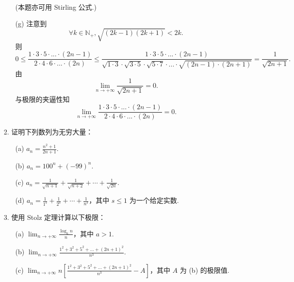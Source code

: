 \begin{enumerate}
\begin{solution}
\begin{enumerate}
\[            \]
            (本题亦可用 Stirling 公式.)
            \item[(g)]注意到
            \[
            \forall k\in\mathbb{N}_{+}, \sqrt{(2k-1)(2k+1)}<2k.
            \]
            则
            \[
            0\leq\frac{1\cdot3\cdot5\cdot...\cdot(2n-1)}{2\cdot4\cdot6\cdot...\cdot(2n)}
            \leq\frac{1\cdot3\cdot5\cdot...\cdot(2n-1)}{\sqrt{1\cdot3}\cdot\sqrt{3\cdot5}\cdot\sqrt{5\cdot7}\cdot...\cdot\sqrt{(2n-1)\cdot(2n+1)}}
            =\frac{1}{\sqrt{2n+1}}.
            \]
            由
            \[
            \lim_{n \to +\infty}\frac{1}{\sqrt{2n+1}}=0.
            \]
            与极限的夹逼性知
            \[
            \lim_{n \to +\infty}\frac{1\cdot3\cdot5\cdot...\cdot(2n-1)}{2\cdot4\cdot6\cdot...\cdot(2n)}=0.
            \]
        \end{enumerate}
        \end{solution}

    \item[2.]证明下列数列为无穷大量：
    \begin{enumerate}
        \item[(a)]$\displaystyle a_n=\frac{n^2+1}{2n+1}$.
        \item[(b)]$\displaystyle a_n=100^n+(-99)^n$.
        \item[(c)]$\displaystyle a_n=\frac{1}{\sqrt{n+1}}+\frac{1}{\sqrt{n+2}}+\cdots+\frac{1}{\sqrt{2n}}$.
        \item[(d)]$\displaystyle a_n=\frac{1}{1^s}+\frac{1}{2^s}+\cdots+\frac{1}{n^s}$，其中 $s\leq 1$ 为一个给定实数.
    \end{enumerate}

    \item[3.]使用 Stolz 定理计算以下极限：
    \begin{enumerate}
        \item[(a)]$\displaystyle \lim_{n \to +\infty}\frac{\log_{a}{n}}{n}$，其中 $a>1$.
        \item[(b)]$\displaystyle \lim_{n \to +\infty}\frac{1^2+3^2+5^2+...+(2n+1)^2}{n^3}$.
        \item[(c)]$\displaystyle \lim_{n \to +\infty}n[\frac{1^2+3^2+5^2+...+(2n+1)^2}{n^3}-A]$，其中 $A$ 为 (b) 的极限值.
    \end{enumerate}


\end{enumerate}
